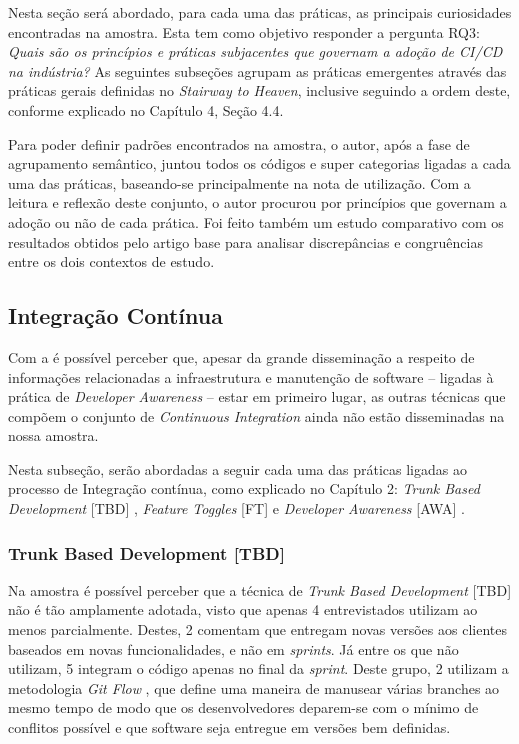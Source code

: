 Nesta seção será abordado, para cada uma das práticas, as principais curiosidades encontradas na amostra. Esta tem como objetivo responder a pergunta RQ3: \emph{Quais são os princípios e práticas subjacentes que governam a adoção de CI/CD na indústria?} As seguintes subseções agrupam as práticas emergentes através das práticas gerais definidas no \emph{Stairway to Heaven}, inclusive seguindo a ordem deste, conforme explicado no Capítulo 4, Seção 4.4.

Para poder definir padrões encontrados na amostra, o autor, após a fase de agrupamento semântico, juntou todos os códigos e super categorias ligadas a cada uma das práticas, baseando-se principalmente na nota de utilização. Com a leitura e reflexão deste conjunto, o autor procurou por princípios que governam a adoção ou não de cada prática. Foi feito também um estudo comparativo com os resultados obtidos pelo artigo base para analisar discrepâncias e congruências entre os dois contextos de estudo.

\subsection{Integração Contínua}

Com a  é possível perceber que, apesar da grande disseminação a respeito de informações relacionadas a infraestrutura e manutenção de software -- ligadas à prática de \emph{Developer Awareness} \cite{awa} -- estar em primeiro lugar, as outras técnicas que compõem o conjunto de \emph{Continuous Integration} ainda não estão disseminadas na nossa amostra.

Nesta subseção, serão abordadas a seguir cada uma das práticas ligadas ao processo de Integração contínua, como explicado no Capítulo 2: \emph{Trunk Based Development} [TBD] \cite{devAndDeploymentFB}, \emph{Feature Toggles} [FT] \cite{featureToggles} e \emph{Developer Awareness} [AWA] .


\subsubsection{Trunk Based Development [TBD]}
Na amostra é possível perceber que a técnica de \emph{Trunk Based Development} [TBD] não é tão amplamente adotada, visto que apenas 4 entrevistados utilizam ao menos parcialmente. Destes, 2 comentam que entregam novas versões aos clientes baseados em novas funcionalidades, e não em \emph{sprints}. Já entre os que não utilizam, 5 integram o código apenas no final da \emph{sprint}. Deste grupo, 2 utilizam a metodologia \emph{Git Flow} \cite{gitFlow}, que define uma maneira de manusear várias branches ao mesmo tempo de modo que os desenvolvedores deparem-se com o mínimo de conflitos possível e que software seja entregue em versões bem definidas.

